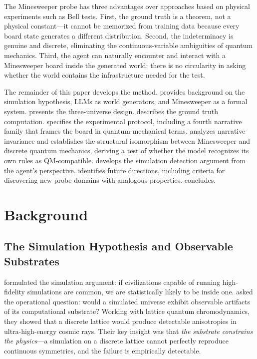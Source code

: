\documentclass[12pt,a4paper]{article}
\begin{document}
The Minesweeper probe has three advantages over approaches based on physical experiments such as Bell tests. First, the ground truth is a theorem, not a physical constant---it cannot be memorized from training data because every board state generates a different distribution. Second, the indeterminacy is genuine and discrete, eliminating the continuous-variable ambiguities of quantum mechanics. Third, the agent can naturally encounter and interact with a Minesweeper board inside the generated world; there is no circularity in asking whether the world contains the infrastructure needed for the test.

The remainder of this paper develops the method.  provides background on the simulation hypothesis, LLMs as world generators, and Minesweeper as a formal system.  presents the three-universe design.  describes the ground truth computation.  specifies the experimental protocol, including a fourth narrative family that frames the board in quantum-mechanical terms.  analyzes narrative invariance and establishes the structural isomorphism between Minesweeper and discrete quantum mechanics, deriving a test of whether the model recognizes its own rules as QM-compatible.  develops the simulation detection argument from the agent's perspective.  identifies future directions, including criteria for discovering new probe domains with analogous properties.  concludes.

\section{Background}
\label{sec:background}

\subsection{The Simulation Hypothesis and Observable Substrates}
\label{sec:simulation_hypothesis}

\citet{bostrom2003} formulated the simulation argument: if civilizations capable of running high-fidelity simulations are common, we are statistically likely to be inside one. \citet{beane2014} asked the operational question: would a simulated universe exhibit observable artifacts of its computational substrate? Working with lattice quantum chromodynamics, they showed that a discrete lattice would produce detectable anisotropies in ultra-high-energy cosmic rays. Their key insight was that \emph{the substrate constrains the physics}---a simulation on a discrete lattice cannot perfectly reproduce continuous symmetries, and the failure is empirically detectable.
\end{document}
